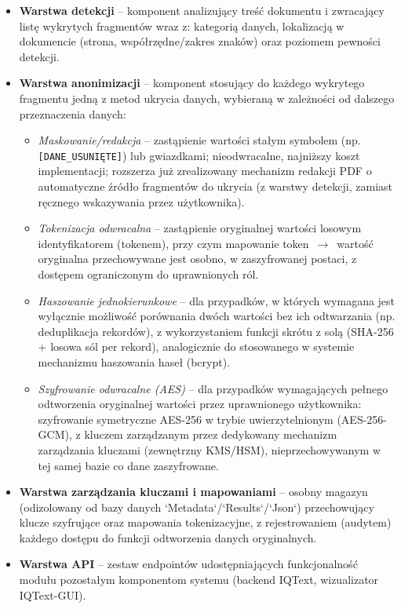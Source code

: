 \begin{itemize}
    \item \textbf{Warstwa detekcji} -- komponent analizujący treść dokumentu i zwracający listę wykrytych fragmentów wraz z: kategorią danych, lokalizacją w dokumencie (strona, współrzędne/zakres znaków) oraz poziomem pewności detekcji.
    \item \textbf{Warstwa anonimizacji} -- komponent stosujący do każdego wykrytego fragmentu jedną z metod ukrycia danych, wybieraną w zależności od dalszego przeznaczenia danych:
    \begin{itemize}
        \item \emph{Maskowanie/redakcja} -- zastąpienie wartości stałym symbolem (np. \texttt{[DANE\_USUNIĘTE]}) lub gwiazdkami; nieodwracalne, najniższy koszt implementacji; rozszerza już zrealizowany mechanizm redakcji PDF o automatyczne źródło fragmentów do ukrycia (z warstwy detekcji, zamiast ręcznego wskazywania przez użytkownika).
        \item \emph{Tokenizacja odwracalna} -- zastąpienie oryginalnej wartości losowym identyfikatorem (tokenem), przy czym mapowanie token~$\rightarrow$~wartość oryginalna przechowywane jest osobno, w zaszyfrowanej postaci, z dostępem ograniczonym do uprawnionych ról.
        \item \emph{Haszowanie jednokierunkowe} -- dla przypadków, w których wymagana jest wyłącznie możliwość porównania dwóch wartości bez ich odtwarzania (np. deduplikacja rekordów), z wykorzystaniem funkcji skrótu z solą (SHA-256 + losowa sól per rekord), analogicznie do stosowanego w systemie mechanizmu haszowania haseł (bcrypt).
        \item \emph{Szyfrowanie odwracalne (AES)} -- dla przypadków wymagających pełnego odtworzenia oryginalnej wartości przez uprawnionego użytkownika: szyfrowanie symetryczne AES-256 w trybie uwierzytelnionym (AES-256-GCM), z kluczem zarządzanym przez dedykowany mechanizm zarządzania kluczami (zewnętrzny KMS/HSM), nieprzechowywanym w tej samej bazie co dane zaszyfrowane.
    \end{itemize}
    \item \textbf{Warstwa zarządzania kluczami i mapowaniami} -- osobny magazyn (odizolowany od bazy danych `Metadata`/`Results`/`Json`) przechowujący klucze szyfrujące oraz mapowania tokenizacyjne, z rejestrowaniem (audytem) każdego dostępu do funkcji odtworzenia danych oryginalnych.
    \item \textbf{Warstwa API} -- zestaw endpointów udostępniających funkcjonalność modułu pozostałym komponentom systemu (backend IQText, wizualizator IQText-GUI).
\end{itemize}

